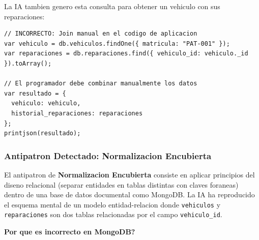 La IA tambien genero esta consulta para obtener un vehiculo con sus reparaciones:

\begin{lstlisting}[caption=Join manual generado por IA (incorrecto)]
// INCORRECTO: Join manual en el codigo de aplicacion
var vehiculo = db.vehiculos.findOne({ matricula: "PAT-001" });
var reparaciones = db.reparaciones.find({ vehiculo_id: vehiculo._id }).toArray();

// El programador debe combinar manualmente los datos
var resultado = {
  vehiculo: vehiculo,
  historial_reparaciones: reparaciones
};
printjson(resultado);
\end{lstlisting}

\subsubsection{Antipatron Detectado: Normalizacion Encubierta}

El antipatron de \textbf{Normalizacion Encubierta} consiste en aplicar principios del diseno relacional (separar entidades en tablas distintas con claves foraneas) dentro de una base de datos documental como MongoDB. La IA ha reproducido el esquema mental de un modelo entidad-relacion donde \texttt{vehiculos} y \texttt{reparaciones} son dos tablas relacionadas por el campo \texttt{vehiculo\_id}.

\textbf{\textquestiondown Por que es incorrecto en MongoDB?}

